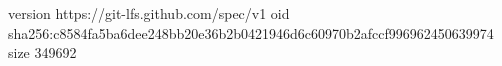 version https://git-lfs.github.com/spec/v1
oid sha256:c8584fa5ba6dee248bb20e36b2b0421946d6c60970b2afccf996962450639974
size 349692
